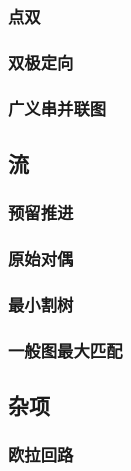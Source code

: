 \documentclass[12pt]{ctexart}
\begin{document}


\subsubsection{点双}



\subsubsection{双极定向}



\subsubsection{广义串并联图}



\subsection{流}

\subsubsection{预留推进}

\subsubsection{原始对偶}

\subsubsection{最小割树}

\subsubsection{一般图最大匹配}

\subsection{杂项}

\subsubsection{欧拉回路}
\end{document}
